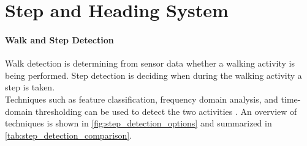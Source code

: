 


\chapter{Step and Heading System}

\subsubsection{Walk and Step Detection}
\label{sec:rw - step detection}
Walk detection is determining from sensor data whether a walking activity is being performed. Step detection is deciding when during the walking activity a step is taken. \\
Techniques such as feature classification, frequency domain analysis, and time-domain thresholding can be used to detect the two activities \cite{Yang2014}. An overview of techniques  is  shown in \cref{fig:step_detection_options} and summarized in \cref{tab:step_detection_comparison}. %

